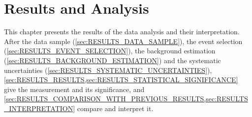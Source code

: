 \documentclass[../../thesis.tex]{subfiles}
\begin{document}
\chapter{Results and Analysis}
\label{sec:RESULTS}

\chaptertitleblock
  {\QuoteChIV}
  {\AttribChIV}
  {This chapter presents the results of the data analysis and their interpretation. After the data sample (\cref{sec:RESULTS_DATA_SAMPLE}), the event selection (\cref{sec:RESULTS_EVENT_SELECTION}), the background estimation (\cref{sec:RESULTS_BACKGROUND_ESTIMATION}) and the systematic uncertainties (\cref{sec:RESULTS_SYSTEMATIC_UNCERTAINTIES}), \cref{sec:RESULTS_RESULTS,sec:RESULTS_STATISTICAL_SIGNIFICANCE} give the measurement and its significance, and \cref{sec:RESULTS_COMPARISON_WITH_PREVIOUS_RESULTS,sec:RESULTS_INTERPRETATION} compare and interpret it.}

\clearpage









\end{document}
